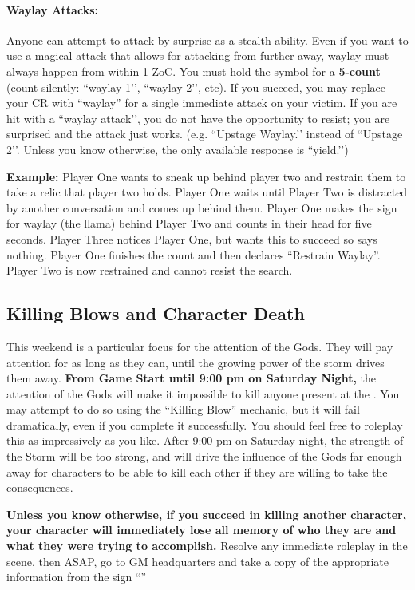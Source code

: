 \documentclass[sheet]{GL2020}
\begin{document}
\paragraph{Waylay Attacks:} Anyone can attempt to attack by surprise as a stealth ability. Even if you want to use a magical attack that allows for attacking from further away, waylay must always happen from within 1 ZoC. You must hold the symbol for a \textbf{5-count} (count silently: ``waylay 1’’, ``waylay 2’’, etc). If you succeed, you may replace your CR with ``waylay'' for a single immediate attack on your victim. If you are hit with a ``waylay attack'’, you do not have the opportunity to resist; you are surprised and the attack just works. (e.g. ``Upstage Waylay.’’ instead of ``Upstage 2’’. Unless you know otherwise, the only available response is ``yield.’’)


\textbf{Example:}\newline
Player One wants to sneak up behind player two and restrain them to take a relic that player two holds. Player One waits until Player Two is distracted by another conversation and comes up behind them. Player One makes the sign for waylay (the llama) behind Player Two and counts in their head for five seconds. Player Three notices Player One, but wants this to succeed so says nothing. Player One finishes the count and then declares “Restrain Waylay”. Player Two is now restrained and cannot resist the search.    


\subsection{Killing Blows and Character Death}

This weekend is a particular focus for the attention of the Gods. They will pay attention for as long as they can, until the growing power of the storm drives them away. \textbf{From Game Start until 9:00 pm on Saturday Night,} the attention of the Gods will make it impossible to kill anyone present at the \pSc{}. You may attempt to do so using the ``Killing Blow'' mechanic, but it will fail dramatically, even if you complete it successfully. You should feel free to roleplay this as impressively as you like. After 9:00 pm on Saturday night, the strength of the Storm will be too strong, and will drive the influence of the Gods far enough away for characters to be able to kill each other if they are willing to take the consequences.


\textbf{Unless you know otherwise, if you succeed in killing another character, your character will immediately lose all memory of who they are and what they were trying to accomplish.} Resolve any immediate roleplay in the scene, then ASAP, go to GM headquarters and take a copy of the appropriate information from the sign ``\sMurderConsequences{}''
\end{document}
